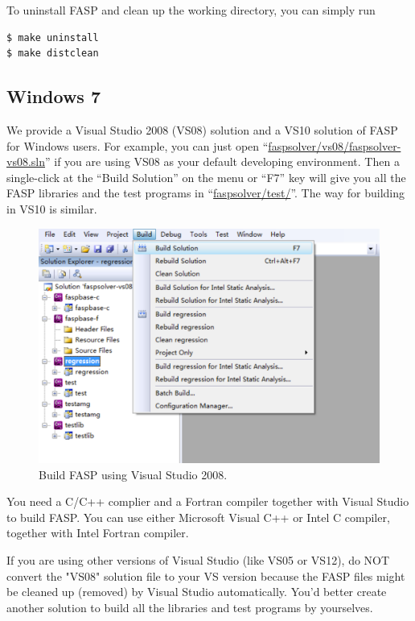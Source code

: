 \documentclass[11pt]{memoir}
\begin{document}
To uninstall FASP and clean up the working directory, you can simply run
%
\begin{lstlisting}[numbers=none]
$ make uninstall
$ make distclean
\end{lstlisting}
%

\subsection{Windows 7}

We provide a Visual Studio 2008 (VS08) solution and a VS10 solution of FASP for Windows users. For example, you can just open ``\url{faspsolver/vs08/faspsolver-vs08.sln}'' if you are using VS08 as your default developing environment. Then a single-click at the ``Build Solution'' on the menu or ``F7'' key  will give you all the FASP libraries and the test programs in ``\url{faspsolver/test/}''. The way for building in VS10 is similar.
\begin{figure}[htbp] %
   \centering
   \includegraphics[width=\linewidth]{fig/build-fasp-win7.pdf} 
   \caption{Build FASP using Visual Studio 2008.}
   \label{fig:build}
\end{figure}

\begin{snugshade}\noindent
You need a C/C++ complier and a Fortran compiler together with Visual Studio to build FASP. You can use either Microsoft Visual C++ or Intel C compiler, together with Intel Fortran compiler.
\end{snugshade}

\begin{snugshade}\noindent
If you are using other versions of Visual Studio (like VS05 or VS12), do NOT convert the "VS08" solution file to your VS version because the FASP files might be cleaned up (removed) by Visual Studio automatically. You'd better create another solution to build all the libraries and test programs by yourselves.
\end{snugshade}
\end{document}
